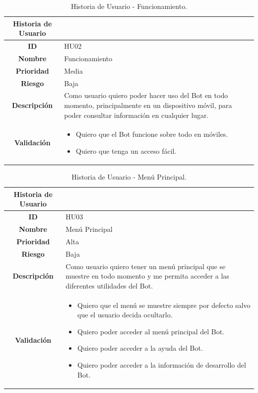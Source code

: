 \begin{table}[H]
	\begin{center}
		\begin{tabular}{| c | p{9cm} |}
			\hline
			
			Historia de Usuario &  \\ \hline
			
			
			\textbf{ID} & HU02 \\
			\textbf{Nombre} & Funcionamiento \\
			\textbf{Prioridad} & Media \\
			\textbf{Riesgo} & Baja \\
			\textbf{Descripción} & Como usuario quiero poder hacer uso del Bot en todo momento, principalmente en un dispositivo móvil, para poder consultar información en cualquier lugar. \\
			\textbf{Validación} & \begin{itemize}
				\item Quiero que el Bot funcione sobre todo en móviles.
				\item Quiero que tenga un acceso fácil.
			\end{itemize} \\ \hline
		\end{tabular}
		\caption{Historia de Usuario - Funcionamiento.}
	\end{center}
\end{table}

\begin{table}[H]
	\begin{center}
		\begin{tabular}{| c | p{9cm} |}
			\hline
			
			Historia de Usuario &  \\ \hline
			
			
			\textbf{ID} & HU03 \\
			\textbf{Nombre} & Menú Principal \\
			\textbf{Prioridad} & Alta \\
			\textbf{Riesgo} & Baja \\
			\textbf{Descripción} & Como usuario quiero tener un menú principal que se muestre en todo momento y me permita acceder a las diferentes utilidades del Bot. \\
			\textbf{Validación} & \begin{itemize}
				\item Quiero que el menú se muestre siempre por defecto salvo que el usuario decida ocultarlo.
				\item Quiero poder acceder al menú principal del Bot.
				\item Quiero poder acceder a la ayuda del Bot.
				\item Quiero poder acceder a la información de desarrollo del Bot.
			\end{itemize} \\ \hline
		\end{tabular}
		\caption{Historia de Usuario - Menú Principal.}
	\end{center}
\end{table}

